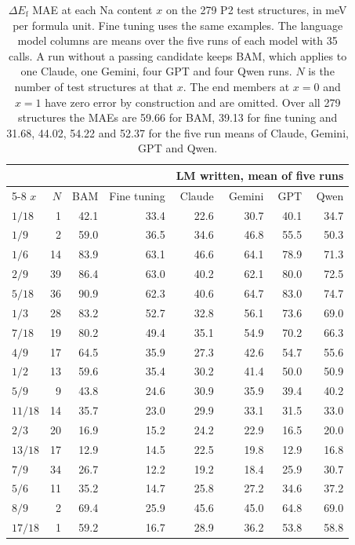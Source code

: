 \begin{table}[h]
\caption{$\Delta E_\mathrm{f}$ MAE at each Na content $x$ on the 279 P2 test structures, in meV per formula unit. Fine tuning uses the same examples. The language model columns are means over the five runs of each model with 35 calls. A run without a passing candidate keeps BAM, which applies to one Claude, one Gemini, four GPT and four Qwen runs. $N$ is the number of test structures at that $x$. The end members at $x=0$ and $x=1$ have zero error by construction and are omitted. Over all 279 structures the MAEs are 59.66 for BAM, 39.13 for fine tuning and 31.68, 44.02, 54.22 and 52.37 for the five run means of Claude, Gemini, GPT and Qwen.}
\label{tab:si-p2-byx}
\centering
\small
\renewcommand{\baselinestretch}{1}\selectfont
\renewcommand{\arraystretch}{1.3}
\setlength{\tabcolsep}{8pt}
\begin{tabular}{lrrrrrrr}
\toprule
 & & & & \multicolumn{4}{c}{LM written, mean of five runs} \\
\cmidrule(lr){5-8}
$x$ & $N$ & BAM & Fine tuning & Claude & Gemini & GPT & Qwen \\
\midrule
$1/18$ & 1 & 42.1 & 33.4 & 22.6 & 30.7 & 40.1 & 34.7 \\
$1/9$ & 2 & 59.0 & 36.5 & 34.6 & 46.8 & 55.5 & 50.3 \\
$1/6$ & 14 & 83.9 & 63.1 & 46.6 & 64.1 & 78.9 & 71.3 \\
$2/9$ & 39 & 86.4 & 63.0 & 40.2 & 62.1 & 80.0 & 72.5 \\
$5/18$ & 36 & 90.9 & 62.3 & 40.6 & 64.7 & 83.0 & 74.7 \\
$1/3$ & 28 & 83.2 & 52.7 & 32.8 & 56.1 & 73.6 & 69.0 \\
$7/18$ & 19 & 80.2 & 49.4 & 35.1 & 54.9 & 70.2 & 66.3 \\
$4/9$ & 17 & 64.5 & 35.9 & 27.3 & 42.6 & 54.7 & 55.6 \\
$1/2$ & 13 & 59.6 & 35.4 & 30.2 & 41.4 & 50.0 & 50.9 \\
$5/9$ & 9 & 43.8 & 24.6 & 30.9 & 35.9 & 39.4 & 40.2 \\
$11/18$ & 14 & 35.7 & 23.0 & 29.9 & 33.1 & 31.5 & 33.0 \\
$2/3$ & 20 & 16.9 & 15.2 & 24.2 & 22.9 & 16.5 & 20.0 \\
$13/18$ & 17 & 12.9 & 14.5 & 22.5 & 19.8 & 12.9 & 16.8 \\
$7/9$ & 34 & 26.7 & 12.2 & 19.2 & 18.4 & 25.9 & 30.7 \\
$5/6$ & 11 & 35.2 & 14.7 & 25.8 & 27.2 & 34.6 & 37.2 \\
$8/9$ & 2 & 69.4 & 25.9 & 45.6 & 45.0 & 64.8 & 69.0 \\
$17/18$ & 1 & 59.2 & 16.7 & 28.9 & 36.2 & 53.8 & 58.8 \\
\bottomrule
\end{tabular}
\end{table}

